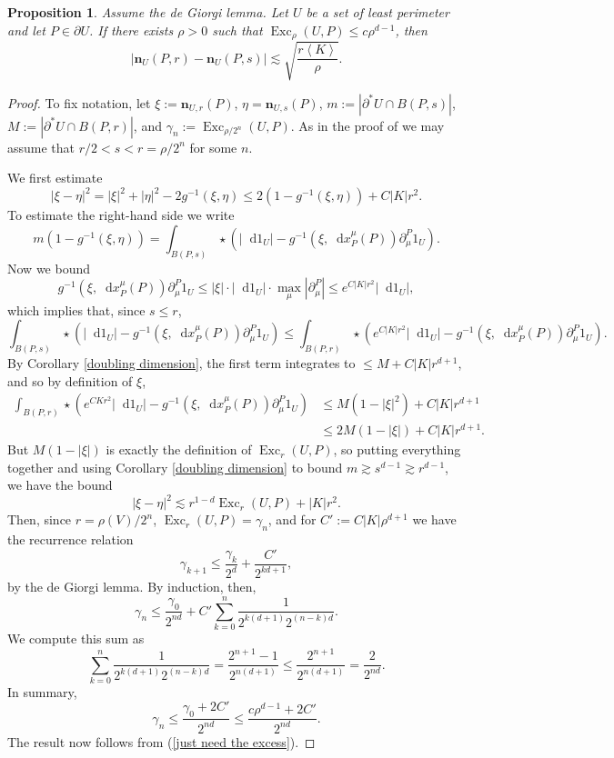 \documentclass[reqno,10pt]{amsart}
\DeclareMathOperator{\Exc}{Exc}
\newcommand*\dif{\mathop{}\!\mathrm{d}}
\newcommand{\normal}{\mathbf n}
\def\Japan#1{\left \langle #1 \right \rangle}
\newtheorem{proposition}[theorem]{Proposition}
\theoremstyle{definition}
\numberwithin{equation}{section}
\begin{document}
\begin{proposition}\label{implication of DGL}
    Assume the de Giorgi lemma. Let $U$ be a set of least perimeter and let $P \in \partial U$.
    If there exists $\rho > 0$ such that $\Exc_\rho(U, P) \leq c\rho^{d - 1}$, then
    \begin{equation}\label{LC Cauchy}
    |\normal_U(P, r) - \normal_U(P, s)| \lesssim \sqrt{\frac{r \Japan K}{\rho}}.
    \end{equation}
\end{proposition}
\begin{proof}
To fix notation, let
$\xi := \normal_{U, r}(P)$, $\eta = \normal_{U, s}(P)$, $m := |\partial^* U \cap B(P, s)|$, $M := |\partial^* U \cap B(P, r)|$, and $\gamma_n := \Exc_{\rho/2^n}(U, P)$.
As in the proof of \cite[Theorem 8.2]{Giusti77} we may assume that $r/2 < s < r = \rho/2^n$ for some $n$.

We first estimate
$$|\xi - \eta|^2 = |\xi|^2 + |\eta|^2 - 2 g^{-1}(\xi, \eta) \leq 2(1 - g^{-1}(\xi, \eta)) + C|K|r^2.$$
To estimate the right-hand side we write 
$$m(1 - g^{-1}(\xi, \eta)) = \int_{B(P, s)} \star(|\dif 1_U| - g^{-1}(\xi, \dif x^\mu_P(P)) \partial^P_\mu 1_U).$$
Now we bound 
$$ g^{-1}(\xi, \dif x^\mu_P(P)) \partial^P_\mu 1_U \leq |\xi| \cdot |\dif 1_U| \cdot \max_\mu |\partial^P_\mu| \leq e^{C|K|r^2} |\dif 1_U|,$$
which implies that, since $s \leq r$,
$$\int_{B(P, s)} \star(|\dif 1_U| - g^{-1}(\xi, \dif x^\mu_P(P)) \partial^P_\mu 1_U) \leq \int_{B(P, r)} \star(e^{C|K|r^2} |\dif 1_U| - g^{-1}(\xi, \dif x^\mu_P(P)) \partial^P_\mu 1_U).$$
By Corollary \ref{doubling dimension}, the first term integrates to $\leq M + C|K|r^{d + 1}$, and so by definition of $\xi$,
\begin{align*}
\int_{B(P, r)} \star(e^{CKr^2} |\dif 1_U| - g^{-1}(\xi, \dif x^\mu_P(P)) \partial^P_\mu 1_U) &\leq M(1 - |\xi|^2) + C|K|r^{d + 1}\\
&\leq 2M(1 - |\xi|) + C|K|r^{d + 1}.
\end{align*}
But $M(1 - |\xi|)$ is exactly the definition of $\Exc_r(U, P)$, so putting everything together and using Corollary \ref{doubling dimension} to bound $m \gtrsim s^{d - 1} \gtrsim r^{d - 1}$, we have the bound 
\begin{equation}\label{just need the excess}
|\xi - \eta|^2 \lesssim r^{1 - d} \Exc_r(U, P) + |K|r^2.
\end{equation}
Then, since $r = \rho(V)/2^n$, $\Exc_r(U, P) = \gamma_n$, and for $C' := C|K|\rho^{d + 1}$ we have the recurrence relation 
$$\gamma_{k + 1} \leq \frac{\gamma_k}{2^d} + \frac{C'}{2^{k{d + 1}}},$$
by the de Giorgi lemma.
By induction, then,
$$\gamma_n \leq \frac{\gamma_0}{2^{nd}} + C' \sum_{k=0}^n \frac{1}{2^{k(d + 1)} 2^{(n - k)d}}.$$
We compute this sum as 
$$\sum_{k=0}^n \frac{1}{2^{k(d + 1)} 2^{(n - k)d}} = \frac{2^{n + 1} - 1}{2^{n(d + 1)}} \leq \frac{2^{n + 1}}{2^{n(d + 1)}} = \frac{2}{2^{nd}}.$$
In summary, 
$$\gamma_n \leq \frac{\gamma_0 + 2C'}{2^{nd}} \leq \frac{c\rho^{d - 1} + 2C'}{2^{nd}}.$$
The result now follows from (\ref{just need the excess}).
\end{proof}
\end{document}
